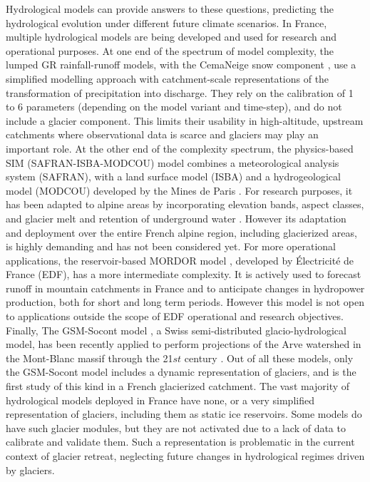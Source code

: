Hydrological models can provide answers to these questions, predicting the hydrological evolution under different future climate scenarios. In France, multiple hydrological models are being developed and used for research and operational purposes. At one end of the spectrum of model complexity, the lumped GR rainfall-runoff models, with the CemaNeige snow component \citep{coron_suite_2017}, use a simplified modelling approach with catchment-scale representations of the transformation of precipitation into discharge. They rely on the calibration of 1 to 6 parameters (depending on the model variant and time-step), and do not include a glacier component. This limits their usability in high-altitude, upstream catchments where observational data is scarce and glaciers may play an important role.  At the other end of the complexity spectrum, the physics-based SIM (SAFRAN-ISBA-MODCOU) model combines a meteorological analysis system (SAFRAN), with a land surface model (ISBA) and a hydrogeological model (MODCOU) developed by the Mines de Paris \citep{habets_safran-isba-modcou_2008}. For research purposes, it has been adapted to alpine areas by incorporating elevation bands, aspect classes, and  glacier melt and retention of underground water \citep{lafaysse_influence_2011}. However its adaptation and deployment over the entire French alpine region, including glacierized areas, is highly demanding \citep[e.g.][]{lecourt_physically-based_2018} and has not been considered yet. For more operational applications, the reservoir-based MORDOR model \citep{paquet_evolution_2004}, developed by Électricité de France (EDF), has a more intermediate complexity. It is actively  used to forecast runoff in mountain catchments in France and to anticipate changes in hydropower production, both for short and long term periods. However this model is not open to applications outside the scope of EDF operational and research objectives. Finally, The GSM-Socont model \citep{schaefli_conceptual_2005}, a Swiss semi-distributed glacio-hydrological model, has been recently applied to perform projections of the Arve watershed in the Mont-Blanc massif through the 21${st}$ century \citep{laurent_impact_2020}. Out of all these models, only the GSM-Socont model includes a dynamic representation of glaciers, and \citet{laurent_impact_2020} is the first study of this kind in a French glacierized catchment. The vast majority of hydrological models deployed in France have none, or a very simplified representation of glaciers, including them as static ice reservoirs. Some models do have such glacier modules, but they are not activated due to a lack of data to calibrate and validate them. Such a representation is problematic in the current context of glacier retreat, neglecting future changes in hydrological regimes driven by glaciers. 

